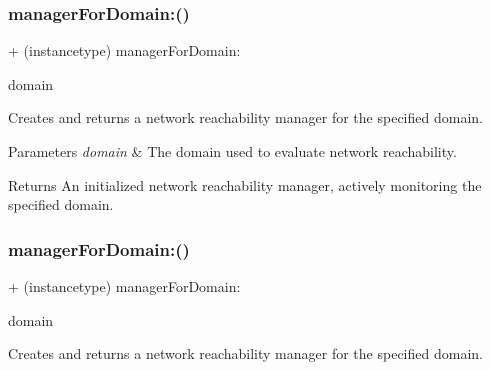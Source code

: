 \subsubsection{\texorpdfstring{manager\+For\+Domain\+:()}{managerForDomain:()}\hspace{0.1cm}{\footnotesize\ttfamily [2/3]}}
{\footnotesize\ttfamily + (instancetype) manager\+For\+Domain\+: \begin{DoxyParamCaption}\item[{(N\+S\+String $\ast$)}]{domain }\end{DoxyParamCaption}}

Creates and returns a network reachability manager for the specified domain.


\begin{DoxyParams}{Parameters}
{\em domain} & The domain used to evaluate network reachability.\\
\hline
\end{DoxyParams}
\begin{DoxyReturn}{Returns}
An initialized network reachability manager, actively monitoring the specified domain. 
\end{DoxyReturn}
\mbox{\label{interface_a_f_network_reachability_manager_a6bb357339197c29a2305519e7e4622f3}} 
\subsubsection{\texorpdfstring{manager\+For\+Domain\+:()}{managerForDomain:()}\hspace{0.1cm}{\footnotesize\ttfamily [3/3]}}
{\footnotesize\ttfamily + (instancetype) manager\+For\+Domain\+: \begin{DoxyParamCaption}\item[{(N\+S\+String $\ast$)}]{domain }\end{DoxyParamCaption}}

Creates and returns a network reachability manager for the specified domain.


